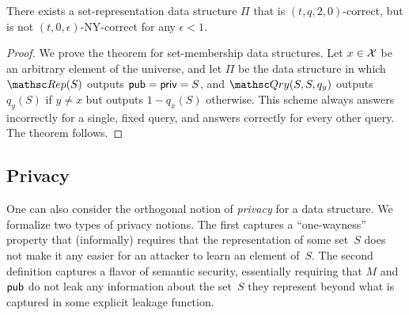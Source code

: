 \begin{theorem}
There exists a set-representation data structure $\Pi$ that
is $(t, q, 2, 0)$-correct, but is not $(t, 0, \epsilon)$-NY-correct
for any $\epsilon<1$.
\end{theorem}
\begin{proof}
We prove the theorem for set-membership data structures.
Let $x \in {\cal X}$ be an arbitrary element of the universe, and
let $\Pi$ be the data structure in which $\Rep(S)$ outputs ${\sf pub}={\sf priv}=S$, and
$\Qry(S, S, q_y)$ outputs $q_y(S)$ if $y \neq x$ but outputs $1-q_x(S)$ otherwise. This
scheme always answers incorrectly for a single, fixed query, and answers
correctly for every other query. The theorem follows.
\end{proof}




\subsection{Privacy}

One can also consider the orthogonal notion of \emph{privacy} for a
data structure. 
We formalize two types of privacy notions. The first captures
a ``one-wayness'' property that (informally) requires that
the representation of some set~$S$ does not make it any easier for an attacker
to learn an element of~$S$.
The second definition
captures a flavor of semantic security, essentially requiring that $M$ and ${\sf pub}$ do
not leak any information about the set~$S$ they represent beyond
what is captured in some explicit leakage function.



